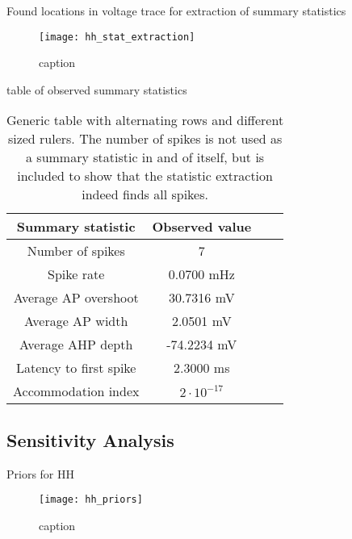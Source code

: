 Found locations in voltage trace for extraction of summary statistics 

\begin{figure}[H]
    \centering
    \texttt{[image: hh\_stat\_extraction]}
    \caption{caption}
    \label{fig:fig1}
\end{figure} 

table of observed summary statistics 

\begin{table}[H]
  \caption{Generic table with alternating rows and different sized rulers. The number of spikes is not used as a summary statistic in and of itself, but is included to show that the statistic extraction indeed finds all spikes.}
  \begin{center}
    \begin{tabular}{cccc}
      \toprule
      \textbf{Summary statistic} & \textbf{Observed value} \\
      \midrule
      Number of spikes &  7 \\
      Spike rate &  0.0700 mHz \\
      Average AP overshoot & 30.7316 mV  \\
      Average AP width &  2.0501 mV \\
      Average AHP depth & -74.2234 mV \\
      Latency to first spike & 2.3000 ms \\
      Accommodation index &  $2 \cdot 10^{-17}$ \\
      \bottomrule
    \end{tabular}
  \end{center}
  \label{tab:hh_obs_sumstats}
\end{table}


\subsection{Sensitivity Analysis}

Priors for HH

\begin{figure}[H]
    \centering
    \texttt{[image: hh\_priors]}
    \caption{caption}
    \label{fig:fig1}
\end{figure} 



